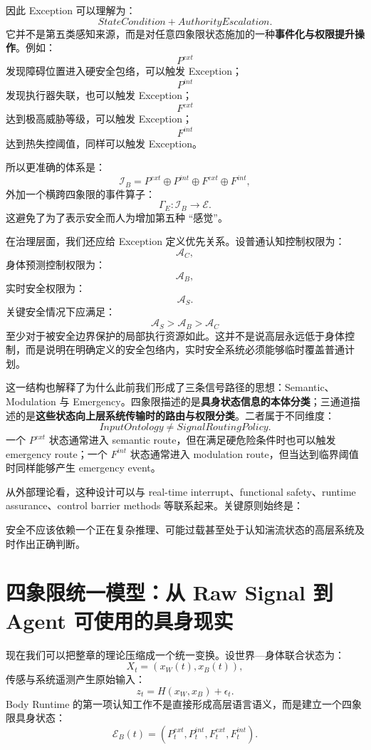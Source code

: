 因此 Exception 可以理解为：
\[
\boxed{
StateCondition
+
AuthorityEscalation.
}
\]
它并不是第五类感知来源，而是对任意四象限状态施加的一种\textbf{事件化与权限提升操作}。例如：
\[
P^{ext}
\]
发现障碍位置进入硬安全包络，可以触发 Exception；
\[
P^{int}
\]
发现执行器失联，也可以触发 Exception；
\[
F^{ext}
\]
达到极高威胁等级，可以触发 Exception；
\[
F^{int}
\]
达到热失控阈值，同样可以触发 Exception。

所以更准确的体系是：
\[
\mathcal I_B
=
P^{ext}
\oplus
P^{int}
\oplus
F^{ext}
\oplus
F^{int},
\]
外加一个横跨四象限的事件算子：
\[
\boxed{
\Gamma_E:
\mathcal I_B
\rightarrow
\mathcal E.
}
\]
这避免了为了表示安全而人为增加第五种 ``感觉''。

在治理层面，我们还应给 Exception 定义优先关系。设普通认知控制权限为：
\[
\mathcal A_C,
\]
身体预测控制权限为：
\[
\mathcal A_B,
\]
实时安全权限为：
\[
\mathcal A_S.
\]
关键安全情况下应满足：
\[
\boxed{
\mathcal A_S
>
\mathcal A_B
>
\mathcal A_C
}
\]
至少对于被安全边界保护的局部执行资源如此。这并不是说高层永远低于身体控制，而是说明在明确定义的安全包络内，实时安全系统必须能够临时覆盖普通计划。

这一结构也解释了为什么此前我们形成了三条信号路径的思想：Semantic、Modulation 与 Emergency。四象限描述的是\textbf{具身状态信息的本体分类}；三通道描述的是\textbf{这些状态向上层系统传输时的路由与权限分类}。二者属于不同维度：
\[
\boxed{
InputOntology
\neq
SignalRoutingPolicy.
}
\]
一个 $P^{ext}$ 状态通常进入 semantic route，但在满足硬危险条件时也可以触发 emergency route；一个 $F^{int}$ 状态通常进入 modulation route，但当达到临界阈值时同样能够产生 emergency event。

从外部理论看，这种设计可以与 real-time interrupt、functional safety、runtime assurance、control barrier methods 等联系起来。关键原则始终是：
\begin{statementbox}
\centering
{}
\end{statementbox}
安全不应该依赖一个正在复杂推理、可能过载甚至处于认知湍流状态的高层系统及时作出正确判断。

\section{四象限统一模型：从 Raw Signal 到 Agent 可使用的具身现实}
\label{sec:four-quadrant-unified-model}

现在我们可以把整章的理论压缩成一个统一变换。设世界—身体联合状态为：
\[
X_t
=
(
x_W(t),
x_B(t)
),
\]
传感与系统遥测产生原始输入：
\[
z_t
=
H(
x_W,
x_B
)
+
\epsilon_t.
\]
Body Runtime 的第一项认知工作不是直接形成高层语言语义，而是建立一个四象限具身状态：
\[
\boxed{
\mathcal E_B(t)
=
\left(
P_t^{ext},
P_t^{int},
F_t^{ext},
F_t^{int}
\right).
}
\]

